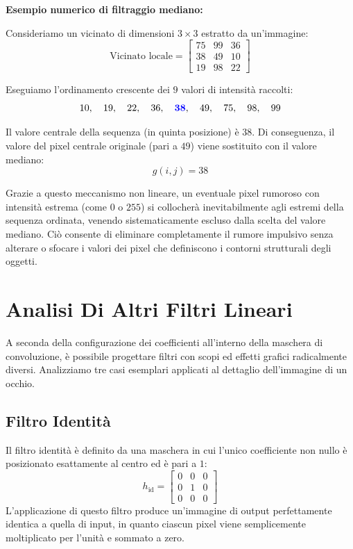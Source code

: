 ﻿\documentclass[11pt, a4paper]{article}
\begin{document}
\textbf{Esempio numerico di filtraggio mediano:}

Consideriamo un vicinato di dimensioni $3\times3$ estratto da un'immagine:
\[
\text{Vicinato locale} = \begin{bmatrix} 75 & 99 & 36 \\ 38 & 49 & 10 \\ 19 & 98 & 22 \end{bmatrix}
\]

Eseguiamo l'ordinamento crescente dei $9$ valori di intensità raccolti:
\[ 10, \quad 19, \quad 22, \quad 36, \quad \textcolor{blue}{\mathbf{38}}, \quad 49, \quad 75, \quad 98, \quad 99 \]

Il valore centrale della sequenza (in quinta posizione) è $38$. Di conseguenza, il valore del pixel centrale originale (pari a $49$) viene sostituito con il valore mediano:
\[ g(i, j) = \boxed{38} \]

Grazie a questo meccanismo non lineare, un eventuale pixel rumoroso con intensità estrema (come $0$ o $255$) si collocherà inevitabilmente agli estremi della sequenza ordinata, venendo sistematicamente escluso dalla scelta del valore mediano. Ciò consente di eliminare completamente il rumore impulsivo senza alterare o sfocare i valori dei pixel che definiscono i contorni strutturali degli oggetti.


\newpage

\section{Analisi Di Altri Filtri Lineari}

A seconda della configurazione dei coefficienti all'interno della maschera di convoluzione, è possibile progettare filtri con scopi ed effetti grafici radicalmente diversi. Analizziamo tre casi esemplari applicati al dettaglio dell'immagine di un occhio.

\subsection{Filtro Identità}

Il filtro identità è definito da una maschera in cui l'unico coefficiente non nullo è posizionato esattamente al centro ed è pari a $1$:
\[ h_{\text{id}} = \begin{bmatrix} 0 & 0 & 0 \\ 0 & 1 & 0 \\ 0 & 0 & 0 \end{bmatrix} \]
L'applicazione di questo filtro produce un'immagine di output perfettamente identica a quella di input, in quanto ciascun pixel viene semplicemente moltiplicato per l'unità e sommato a zero.
\end{document}
